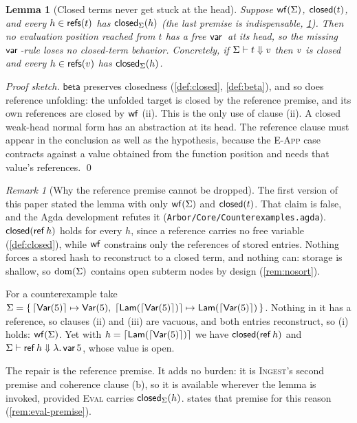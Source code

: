 \documentclass[11pt]{article}
\theoremstyle{definition}
\theoremstyle{plain}
\newtheorem{lemma}[theorem]{Lemma}
\theoremstyle{remark}
\newtheorem{remark}{Remark}[section]
\begin{document}
\begin{lemma}[Closed terms never get stuck at the head]\label{lem:closed-no-stuck}
Suppose $\mathsf{wf}(\Sigma)$, $\mathsf{closed}(t)$, and every $h \in \mathsf{refs}(t)$ has $\mathsf{closed}_{\Sigma}(h)$
(the last premise is indispensable, \cref{rem:nostuck-gap}). Then no evaluation position
reached from $t$ has a free $\mathsf{var}\,$ at its head, so the missing $\Var$-rule loses no
closed-term behavior. Concretely, if $\Sigma \vdash t \Downarrow v$ then $v$ is closed and every
$h \in \mathsf{refs}(v)$ has $\mathsf{closed}_{\Sigma}(h)$.
\end{lemma}
\begin{proof}[Proof sketch]
$\mathsf{beta}$ preserves closedness (\cref{def:closed}, \cref{def:beta}), and so does
reference unfolding: the unfolded target is closed by the reference premise, and its own
references are closed by $\mathsf{wf}$ (ii). This is the only use of clause (ii). A closed weak-head
normal form has an abstraction at its head. The reference clause must appear in the
conclusion as well as the hypothesis, because the \textsc{E-App} case contracts against a
value obtained from the function position and needs that value's references. \qed
\end{proof}

\begin{remark}[Why the reference premise cannot be dropped]\label{rem:nostuck-gap}
The first version of this paper stated the lemma with only $\mathsf{wf}(\Sigma)$ and $\mathsf{closed}(t)$.
That claim is false, and the Agda development refutes it
(\texttt{Arbor/Core/Counterexamples.agda}). $\mathsf{closed}(\mathsf{ref}\,h)$ holds for every $h$, since
a reference carries no free variable (\cref{def:closed}), while $\mathsf{wf}$ constrains only the
references of stored entries. Nothing forces a stored hash to reconstruct to a closed term,
and nothing can: storage is shallow, so $\operatorname{dom}(\Sigma)$ contains open subterm nodes by design
(\cref{rem:nosort}).

For a counterexample take $\Sigma = \{\,\lceil \mathsf{Var}(5) \rceil \mapsto \mathsf{Var}(5),\;
\lceil \mathsf{Lam}(\lceil \mathsf{Var}(5) \rceil) \rceil \mapsto \mathsf{Lam}(\lceil \mathsf{Var}(5) \rceil)\,\}$. Nothing in it has a
reference, so clauses (ii) and (iii) are vacuous, and both entries reconstruct, so (i) holds:
$\mathsf{wf}(\Sigma)$. Yet with $h = \lceil \mathsf{Lam}(\lceil \mathsf{Var}(5) \rceil) \rceil$ we have $\mathsf{closed}(\mathsf{ref}\,h)$
and $\Sigma \vdash \mathsf{ref}\,h \Downarrow \lambda.\,\mathsf{var}\,5$, whose value is open.

The repair is the reference premise. It adds no burden: it is \textsc{Ingest}'s second premise
and coherence clause (b), so it is available wherever the lemma is invoked, provided
\textsc{Eval} carries $\mathsf{closed}_{\Sigma}(h)$.  states that premise for
this reason (\cref{rem:eval-premise}).
\end{remark}
\end{document}
